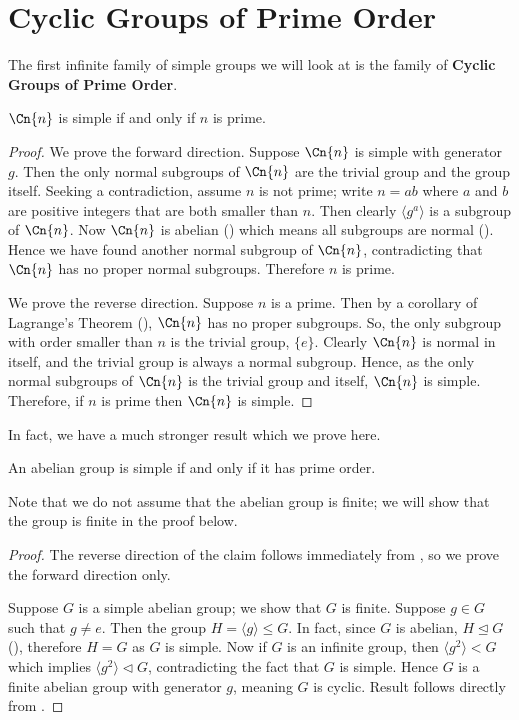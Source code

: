 \section{Cyclic Groups of Prime Order}
The first infinite family of simple groups we will look at is the family of \textbf{Cyclic Groups of Prime Order}.

\begin{lemma}\label{lemma-cyclic-group-simple-iff-order-is-prime}
    $\Cn{n}$ is simple if and only if $n$ is prime.
\end{lemma}
\begin{proof}
    We prove the forward direction. Suppose $\Cn{n}$ is simple with generator $g$. Then the only normal subgroups of $\Cn{n}$ are the trivial group and the group itself. Seeking a contradiction, assume $n$ is not prime; write $n = ab$ where $a$ and $b$ are positive integers that are both smaller than $n$. Then clearly $\langle g^a\rangle$ is a subgroup of $\Cn{n}$. Now $\Cn{n}$ is abelian () which means all subgroups are normal (). Hence we have found another normal subgroup of $\Cn{n}$, contradicting that $\Cn{n}$ has no proper normal subgroups. Therefore $n$ is prime.
    
    We prove the reverse direction. Suppose $n$ is a prime. Then by a corollary of Lagrange's Theorem (), $\Cn{n}$ has no proper subgroups. So, the only subgroup with order smaller than $n$ is the trivial group, $\{e\}$. Clearly $\Cn{n}$ is normal in itself, and the trivial group is always a normal subgroup. Hence, as the only normal subgroups of $\Cn{n}$ is the trivial group and itself, $\Cn{n}$ is simple. Therefore, if $n$ is prime then $\Cn{n}$ is simple.
\end{proof}

In fact, we have a much stronger result which we prove here.
\begin{theorem}\label{thrm-abelian-group-simple-iff-cylic-group-of-prime-order}
    An abelian group is simple if and only if it has prime order.
\end{theorem}
Note that we do not assume that the abelian group is finite; we will show that the group is finite in the proof below.
\begin{proof}
    The reverse direction of the claim follows immediately from , so we prove the forward direction only.
    
    Suppose $G$ is a simple abelian group; we show that $G$ is finite. Suppose $g \in G$ such that $g \neq e$. Then the group $H = \langle g \rangle \leq G$. In fact, since $G$ is abelian, $H \unlhd G$ (), therefore $H = G$ as $G$ is simple. Now if $G$ is an infinite group, then $\langle g^2 \rangle < G$ which implies $\langle g^2 \rangle \lhd G$, contradicting the fact that $G$ is simple. Hence $G$ is a finite abelian group with generator $g$, meaning $G$ is cyclic. Result follows directly from .
\end{proof}

